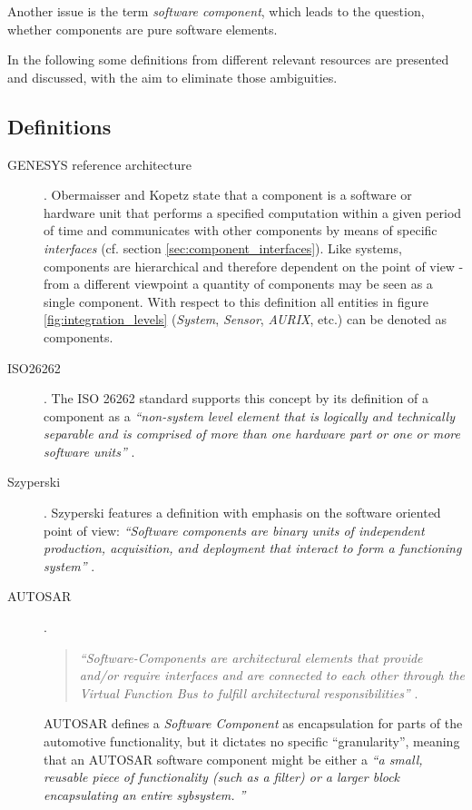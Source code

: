 Another issue is the term \emph{software component}, which leads to the question, whether components are pure software elements.

In the following some definitions from different relevant resources are presented and discussed, with the aim to eliminate those ambiguities.

\subsection{Definitions}

\begin{description}
	\item [GENESYS reference architecture] .
	Obermaisser and Kopetz state that a component is a software or hardware unit that performs a specified computation within a given period of time \cite[p.38]{genesys} and communicates with other components by means of specific \emph{interfaces} (cf. section \ref{sec:component_interfaces}). Like systems, components are hierarchical and therefore dependent on the point of view - from a different viewpoint a quantity of components may be seen as a single component. With respect to this definition all entities in figure \ref{fig:integration_levels} (\emph{System}, \emph{Sensor}, \emph{AURIX}, etc.) can be denoted as components.

	\item [ISO26262] .
	The ISO 26262 standard supports this concept by its definition of a component as a \emph{``non-system level element that is logically and technically separable and is comprised of more than one hardware part or one or more software units''} \cite{iso26262:1}.

	\item [Szyperski].
	Szyperski features a definition with emphasis on the software oriented point of view: \emph{``Software components are binary units of independent production, acquisition, and deployment that interact to form a functioning system''} \cite[p.xxi]{szyperski}.

	\item [AUTOSAR].
	\begin{quote}
	\emph{``Software-Components are architectural elements that provide and/or require interfaces and are connected to each other through the Virtual Function Bus to fulfill architectural responsibilities''} \cite{autosar_glossary}.
	\end{quote}

	AUTOSAR defines a \emph{Software Component} as encapsulation for parts of the automotive functionality, but it dictates no specific ``granularity'', meaning that an AUTOSAR software component might be either a \emph{``a small, reusable piece of functionality (such as a filter) or a larger block encapsulating an entire sybsystem. \cite{autosar}''}


\end{description}
